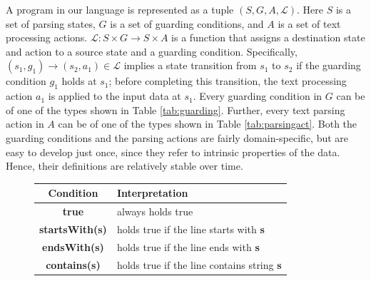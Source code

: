 A program in our language is represented as a tuple $\left( S,G,A, \mathcal{L} \right)$.  Here $S$ is a set of parsing states, $G$ is a set of guarding conditions, and $A$ is a set of text processing actions. $\mathcal{L}: S \times G \to S \times A$ is a function that assigns a destination state and action to a source state and a guarding condition. Specifically, $\left(s_1,g_1\right) \to \left(s_2,a_1\right) \in \mathcal{L}$ implies a state transition from $s_1$ to $s_2$ if the guarding condition $g_1$ holds at $s_1$; before completing this transition, the text processing action $a_1$ is applied to the input data at $s_1$.  Every guarding condition in $G$ can be of one of the types shown in Table \ref{tab:guarding}. Further, every text parsing action in $A$ can be of one of the types shown in Table \ref{tab:parsingact}. Both the guarding conditions and the parsing actions are fairly domain-specific, but are easy to develop just once, since they refer to intrinsic properties of the data. Hence, their definitions are relatively stable over time.

\begin{figure}[h]
\begin{tabular}{|c|l|} 
 \hline
 \textbf{Condition} & \textbf{Interpretation} \\\hline
 \textbf{true} & always holds true \\\hline
 \textbf{startsWith(s)} & holds true if the line starts with \textbf{s}  \\\hline 
 \textbf{endsWith(s)} & holds true if the line ends with \textbf{s}  \\\hline
 \textbf{contains(s)} & holds true if the line contains string \textbf{s}\\
 \hline
\end{tabular}
\vspace{0.2mm}
\end{figure}


